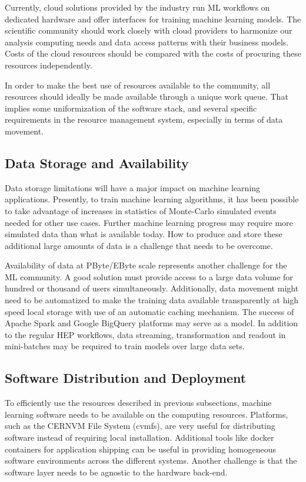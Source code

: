 Currently, cloud solutions provided by the industry run ML workflows on dedicated hardware and offer interfaces for training machine learning models. The scientific community should work closely with cloud providers to harmonize our analysis computing needs and data access patterns with their business models. Costs of the cloud resources should be compared with the costs of procuring these resources independently.

In order to make the best use of resources available to the community, all resources should ideally be made available through a unique work queue. That implies some uniformization of the software stack, and several specific requirements in the resource management system, especially in terms of data movement.

\subsection{Data Storage and Availability}
Data storage limitations will have a major impact on machine learning applications. Presently, to train machine learning algorithms, it has been possible to take advantage of increases in statistics of Monte-Carlo simulated events needed for other use cases. Further machine learning progress may require more simulated data than what is available today. How to produce and store these additional large amounts of data is a challenge that needs to be overcome.

Availability of data at PByte/EByte scale represents another challenge for the ML community.
A good solution must provide access to a large data volume for hundred or thousand of users simultaneously.
Additionally, data movement might need to be automatized to make the training data available transparently at high speed local storage with use of an automatic caching mechanism.
The success of Apache Spark and Google BigQuery platforms may serve as a model.
In addition to the regular HEP workflows, data streaming, transformation and readout in mini-batches may be required to train models over large data sets.

\subsection{Software Distribution and Deployment}
To efficiently use the resources described in previous subsections, machine learning software needs to be available on the computing resources. Platforms, such as the CERNVM File System (cvmfs), are very useful for distributing software instead of requiring local installation. Additional tools like docker containers for application shipping can be useful in providing homogeneous software environments across the different systems. Another challenge is that the software layer needs to be agnostic to the hardware back-end.

